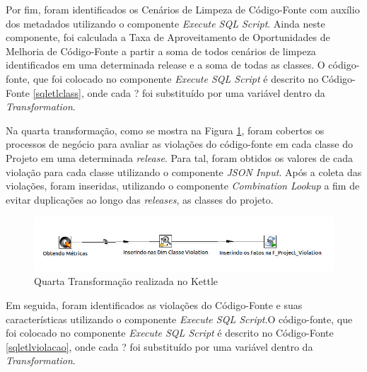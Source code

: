 \begin{apendicesenv}
Por fim, foram identificados os Cenários de Limpeza de Código-Fonte com auxílio dos metadados utilizando o componente \textit{Execute SQL Script}. Ainda neste componente, foi calculada a Taxa de Aproveitamento de Oportunidades de Melhoria de Código-Fonte a partir a soma de todos cenários de limpeza identificados em uma determinada release e a soma de todas as classes. O código-fonte, que foi colocado no componente \textit{Execute SQL Script} é descrito no Código-Fonte \ref{sqletlclass}, onde cada ? foi substituído por uma variável dentro da \textit{Transformation}.



Na quarta transformação, como se mostra na Figura \ref{fig:quartatransformation}, foram cobertos os processos de negócio para avaliar as violações do código-fonte em cada classe do Projeto em uma determinada \textit{release}. Para tal, foram obtidos os valores de cada violação para cada classe utilizando o componente \textit{JSON Input}. Após a coleta das violações, foram inseridas, utilizando o componente \textit{Combination Lookup} a fim de evitar duplicações ao longo das \textit{releases}, as classes do projeto.

\begin{figure}[h!]
\centering
\includegraphics[keepaspectratio=false,scale=0.55]{figuras/figuras_nilton/quartatransformation.png}
\caption{Quarta Transformação realizada no Kettle}
\label{fig:quartatransformation}
\end{figure}
\FloatBarrier


Em seguida, foram identificados as violações do Código-Fonte e suas características utilizando o componente \textit{Execute SQL Script}.O código-fonte, que foi colocado no componente \textit{Execute SQL Script} é descrito no Código-Fonte \ref{sqletlviolacao}, onde cada ? foi substituído por uma variável dentro da \textit{Transformation}.





\end{apendicesenv}
